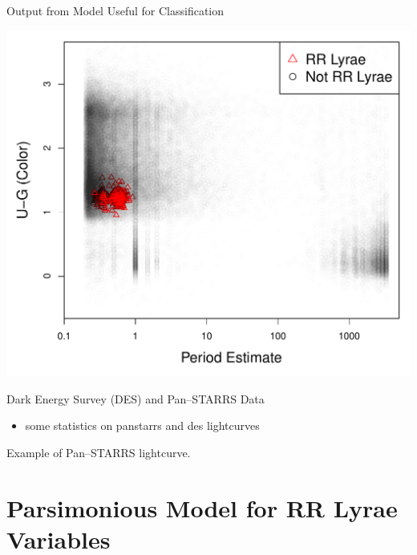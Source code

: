 \documentclass[12pt]{beamer}
\begin{document}
\begin{frame}{Output from Model Useful for Classification}

\begin{center}
\includegraphics[scale=.4]{figs/sdss_color_period.pdf}
\end{center}



\end{frame}


\begin{frame}{Dark Energy Survey (DES) and Pan--STARRS Data}

\begin{itemize}
\item some statistics on panstarrs and des lightcurves
\end{itemize}

Example of Pan--STARRS lightcurve.

\end{frame}










\section{Parsimonious Model for RR Lyrae Variables}
\end{document}
